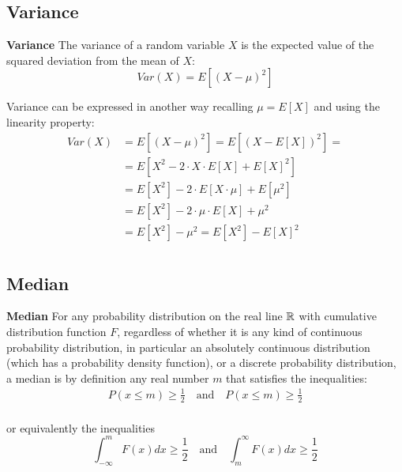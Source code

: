 \subsection{Variance}
\label{Variance}
\begin{definition}{\textbf{Variance}}
The variance of a random variable $X$ is the expected value of the squared deviation from the mean of $X$:
\begin{equation}
Var\left( X\right) = E\left[ \left( X - \mu \right)^2\right] 
\end{equation}

Variance can be expressed in another way recalling $\mu = E\left[ X\right]$ and using the linearity property:
\begin{equation}
\begin{aligned}
	Var\left( X\right) &= E\left[ \left( X - \mu \right)^2\right] = E\left[ \left( X - E\left[ X\right] \right)^2\right] =\\
	&= E\left[ X^2 - 2\cdot X \cdot E\left[ X\right] + E\left[ X\right] ^2\right]\\
	&= E\left[ X^2\right] - 2\cdot E\left[X \cdot \mu \right]+ E\left[\mu^2\right]\\
	&= E\left[ X^2\right] - 2\cdot \mu \cdot E\left[X\right]+\mu^2 \\
	&= E\left[ X^2\right] - \mu^2 = E\left[ X^2\right] - E\left[ X\right] ^2 \\
\end{aligned}
\end{equation}

\end{definition}

\subsection{Median}
\begin{definition}{\textbf{Median}}
For any probability distribution on the real line $\mathbb{R}$ with cumulative distribution function $F$, regardless of whether it is any kind of continuous probability distribution, in particular an absolutely continuous distribution (which has a probability density function), or a discrete probability distribution, a median is by definition any real number $m$ that satisfies the inequalities:
\begin{align}
P(x\le m) \ge \frac{1}{2} \quad \text{and} \quad P(x\le m) \ge \frac{1}{2}\\
\end{align}

or equivalently the inequalities
\begin{equation}
\int_{- \infty}^{m} F(x) dx \ge  \frac{1}{2} \quad \text{and} \quad \int_{m}^{\infty} F(x) dx \ge  \frac{1}{2} 
\end{equation}
\end{definition}

